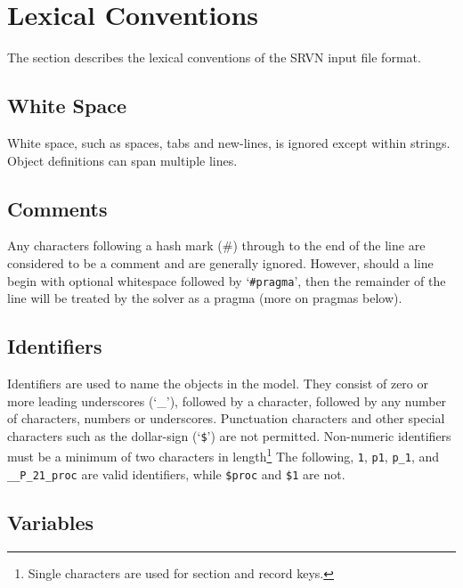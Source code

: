 \section{Lexical Conventions}

The section describes the lexical conventions of the SRVN input file format.

\subsection{White Space}

White space, such as spaces, tabs and new-lines, is ignored except within strings.
Object definitions can span multiple lines.

\subsection{Comments}

Any characters following a hash mark (\#)\index{\#} through to the end of the line are considered to be a
comment and are generally ignored.  However, should a line begin with optional whitespace
followed by `\texttt{\#pragma}', then the remainder of the line will be
treated by the solver as a pragma (more on pragmas below).

\subsection{Identifiers}
\label{sec:lqn-identifiers}\label{LQN!identifiers|textbf}

Identifiers are used to name the objects in the model.  They consist of zero or more
leading underscores (`\_'), followed by a character, followed by any number of characters, numbers or
underscores. Punctuation characters and other special characters such as the dollar-sign (`\texttt{\$}') are
not permitted.  Non-numeric identifiers must be a minimum of two characters in length\footnote{Single
  characters are used for section and record keys.}  The following, {\tt 1}, {\tt p1}, {\tt p\_1}, and {\tt
  \_\_P\_21\_proc} are valid identifiers, while {\tt \$proc} and {\tt \$1} are not.

\subsection{Variables}
\label{sec:lqn-variables}\label{LQN!variables|textbf}

